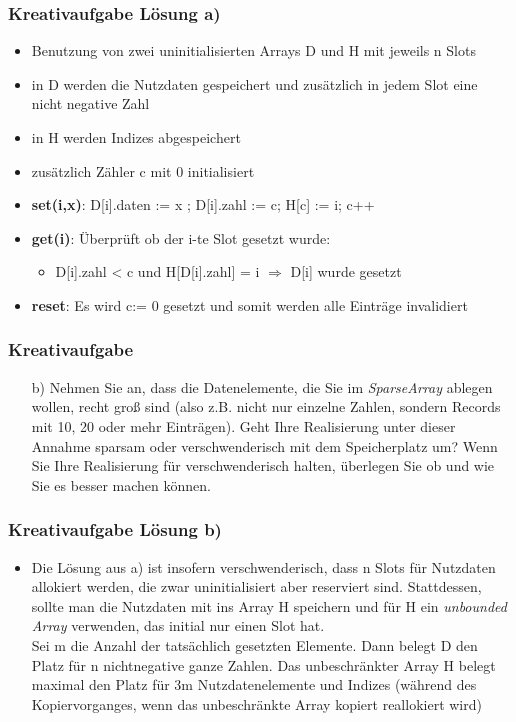 \begin{frame}
	\frametitle{Kreativaufgabe Lösung a)}
	\begin{itemize}
		\item Benutzung von zwei uninitialisierten Arrays D und H mit jeweils n Slots
		\item in D werden die Nutzdaten gespeichert und zusätzlich in jedem Slot eine nicht negative Zahl
		\item in H werden Indizes abgespeichert
		\item zusätzlich Zähler c mit 0 initialisiert
		\item \textbf{set(i,x)}: D[i].daten := x ; D[i].zahl := c; H[c] := i; c++ 
		\item \textbf{get(i)}: Überprüft ob der i-te Slot gesetzt wurde:
			\begin{itemize}
				\item D[i].zahl < c und H[D[i].zahl] = i $\Rightarrow$ D[i] wurde gesetzt
			\end{itemize}
		\item \textbf{reset}: Es wird c:= 0 gesetzt und somit werden alle Einträge invalidiert

	\end{itemize}
\end{frame}

\begin{frame}
	\frametitle{Kreativaufgabe}

	\begin{itemize}
		\item[b)] Nehmen Sie an, dass die Datenelemente, die Sie im \textit{SparseArray} ablegen wollen, recht groß sind (also z.B. nicht nur einzelne Zahlen, sondern Records mit 10, 20 oder mehr Einträgen).
			Geht Ihre Realisierung unter dieser Annahme sparsam oder verschwenderisch mit dem Speicherplatz um? Wenn Sie Ihre Realisierung für verschwenderisch halten, überlegen Sie
			ob und wie Sie es besser machen können.
	\end{itemize}

\end{frame}
\begin{frame}
	\frametitle{Kreativaufgabe Lösung b)}
	\begin{itemize}
		\item Die Lösung aus a) ist insofern verschwenderisch, dass n Slots für Nutzdaten allokiert
		werden, die zwar uninitialisiert aber reserviert sind. Stattdessen, sollte man die Nutzdaten
		mit ins Array H speichern und für H ein \textit{unbounded Array} verwenden, das initial nur
		einen Slot hat.\\ Sei m die Anzahl der tatsächlich gesetzten Elemente. Dann belegt D den Platz für 
		n nichtnegative ganze Zahlen. Das unbeschränkter Array H belegt maximal den Platz für 3m
		Nutzdatenelemente und Indizes (während des Kopiervorganges, wenn das unbeschränkte
		Array kopiert reallokiert wird)
	\end{itemize}
\end{frame}

